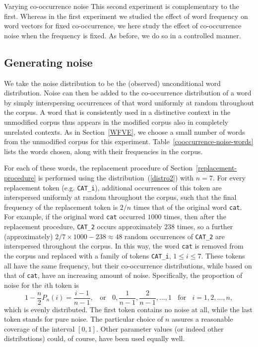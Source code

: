 \documentclass{article} %
\newcommand{\word}[1]{\texttt{#1}}
\begin{document}
\begin{section}{Varying co-occurrence noise}\label{CNVE}
This second experiment is complementary to the first.  Whereas in the
first experiment we studied the effect of word frequency on word vectors
for fixed co-occurrence, we here study the effect of co-occurrence noise
when the frequency is fixed.  As before, we do so in a controlled
manner.
  
\subsection{Generating noise}
We take the noise distribution to be the (observed) unconditional word
distribution.  Noise can then be added to the co-occurrence distribution
of a word by simply interspersing occurrences of that word uniformly at
random throughout the corpus.  A word that is consistently used in a
distinctive context in the unmodified corpus thus appears in the
modified corpus also in completely unrelated contexts.  As in
Section~\ref{WFVE}, we choose a small number of words from the
unmodified corpus for this experiment.
Table~\ref{cooccurrence-noise-words} lists the words chosen, along with
their frequencies in the corpus.

For each of these words, the replacement procedure of
Section~\ref{replacement-procedure} is performed using the
distribution~(\ref{distro2}) with $n=7$.  For every replacement token
(e.g. \word{CAT\_i}), additional occurrences of this token are
interspersed uniformly at random throughout the corpus, such that the
final frequency of the replacement token is $2/n$ times that of the
original word \word{cat}.  For example, if the original word \word{cat}
occurred $1000$ times, then after the replacement procedure,
\word{CAT\_2} occurs approximately $238$ times, so a further
(approximately) $2/7 \times 1000 - 238 \approx 48$ random occurrences of
\word{CAT\_2} are interspersed throughout the corpus.  In this way, the
word \word{cat} is removed from the corpus and replaced with a family of
tokens \word{CAT\_i}, $1 \leqslant i \leqslant 7$.  These tokens all
have the same frequency, but their co-occurrence distributions, while
based on that of \word{cat}, have an increasing amount of noise.
Specifically, the proportion of noise for the $i$th token is
%
$$ 1 - \frac{n}{2} P_n(i) = \frac{i-1}{n-1} , \;\; \textrm{ or } \;\; 0,
\frac{1}{n-1}, \frac{2}{n-1}, \ldots, 1 \;\; \textrm{ for } \;\; i =
1,2, \ldots, n , 
$$ 
%
which is evenly distributed.  The first token contains no noise at all,
while the last token stands for pure noise.  The particular choice of
$n$ assures a reasonable coverage of the interval $[0,1]$.  Other
parameter values (or indeed other distributions) could, of course, have
been used equally well.


\end{section}
\end{document}

